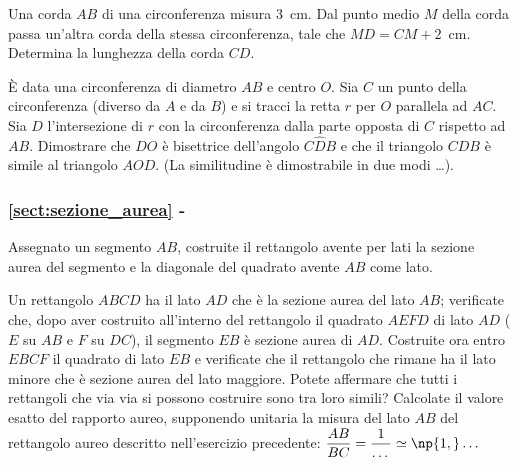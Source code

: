 \begin{esercizio}
\label{ese:6.105}
Una corda $AB$ di una circonferenza misura 3~cm. Dal punto medio $M$ della corda passa un'altra corda della stessa circonferenza, tale che $MD=CM+2$~cm. Determina la lunghezza della corda $CD$.
\end{esercizio}

\begin{esercizio}
\label{ese:6.106}
\`E data una circonferenza di diametro $AB$ e centro $O$. Sia $C$ un punto della circonferenza (diverso da $A$ e da $B$) e si tracci la retta $r$ per $O$ parallela ad $AC$. Sia $D$ l'intersezione di $r$ con la circonferenza dalla parte opposta di $C$ rispetto ad $AB$. Dimostrare che $DO$ è bisettrice dell'angolo $C\widehat{D}B$ e che il triangolo $CDB$ è simile al triangolo $AOD$. (La similitudine è dimostrabile in due modi \ldots{}).
\end{esercizio}

\begingroup
\hypersetup{linkcolor=black}
\subsubsection*{\ref{sect:sezione_aurea} - }
\endgroup

\begin{esercizio}
\label{ese:6.107}
Assegnato un segmento $AB$, costruite il rettangolo avente per lati la sezione aurea del segmento e la diagonale del quadrato avente $AB$ come lato.
\end{esercizio}

\begin{esercizio}
\label{ese:6.108}
Un rettangolo $ABCD$ ha il lato $AD$ che è la sezione aurea del lato $AB$; verificate che, dopo aver costruito all'interno del rettangolo il quadrato $AEFD$ di lato $AD$ ($E$ su $AB$ e $F$ su $DC$), il segmento $EB$ è sezione aurea di $AD$. Costruite ora entro $EBCF$ il quadrato di lato $EB$ e verificate che il rettangolo che rimane ha il lato minore che è sezione aurea del lato maggiore. Potete affermare che tutti i rettangoli che via via si possono costruire sono tra loro simili? Calcolate il valore esatto del rapporto aureo, supponendo unitaria la misura del lato $AB$ del rettangolo aureo descritto nell'esercizio precedente: $\dfrac{AB}{BC}=\dfrac{1}{\ldots{}}\simeq \np{1,}\ldots{}$
\end{esercizio}

